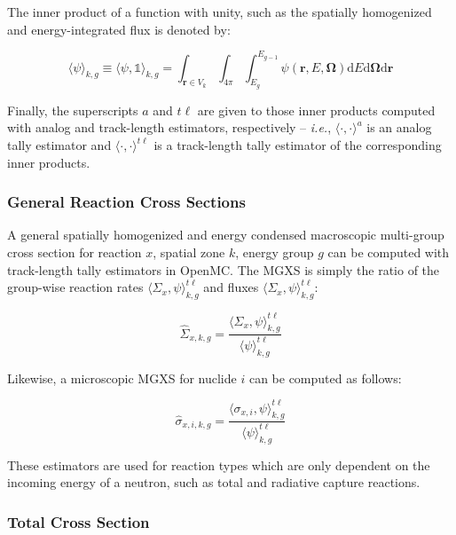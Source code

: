 \noindent The inner product of a function with unity, such as the spatially homogenized and energy-integrated flux is denoted by:

\begin{equation}
\label{eqn:chap3-angle-flux}
\langle \psi \rangle_{k,g} \equiv \langle \psi, \mathbb{1} \rangle_{k,g} = \int_{\mathbf{r} \in V_{k}} \int_{4\pi} \int_{E_{g}}^{E_{g-1}} \psi(\mathbf{r},E,\mathbf{\Omega}) \mathrm{d}E\mathrm{d}\mathbf{\Omega}\mathrm{d}\mathbf{r}
\end{equation}

Finally, the superscripts $a$ and $t\ell$ are given to those inner products computed with analog and track-length estimators, respectively -- \textit{i.e.}, $\langle \cdot,\cdot \rangle^{a}$ is an analog tally estimator and $\langle \cdot,\cdot \rangle^{t\ell}$ is a track-length tally estimator of the corresponding inner products.


\subsubsection{General Reaction Cross Sections}
\label{subsubsec:chap3-gen-xs}

A general spatially homogenized and energy condensed macroscopic multi-group cross section for reaction $x$, spatial zone $k$, energy group $g$ can be computed with track-length tally estimators in OpenMC. The \ac{MGXS} is simply the ratio of the group-wise reaction rates $\langle \Sigma_{x}, \psi \rangle_{k,g}^{t\ell}$ and fluxes $\langle \Sigma_{x}, \psi \rangle_{k,g}^{t\ell}$:

\begin{equation}
\label{eqn:chap3-general-macro}
\hat{\Sigma}_{x,k,g} = \frac{\langle \Sigma_{x}, \psi \rangle_{k,g}^{t\ell}}{\langle \psi \rangle_{k,g}^{t\ell}}
\end{equation}

\noindent Likewise, a microscopic \ac{MGXS} for nuclide $i$ can be computed as follows:

\begin{equation}
\label{eqn:chap3-general-micro}
\hat{\sigma}_{x,i,k,g} = \frac{\langle \sigma_{x,i}, \psi \rangle_{k,g}^{t\ell}}{\langle \psi \rangle_{k,g}^{t\ell}}
\end{equation}

These estimators are used for reaction types which are only dependent on the incoming energy of a neutron, such as total and radiative capture reactions.


\subsubsection{Total Cross Section}
\label{subsubsec:chap3-tally-types-tot-xs}

